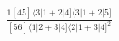 \documentclass[varwidth, border=5pt]{standalone}
\begin{document}
\begin{my}
$\begin{gathered}
\scriptscriptstyle\frac{1[45]⟨3|1+2|4]⟨3|1+2|5]}{[56]⟨1|2+3|4]⟨2|1+3|4]^2}
\end{gathered}$
\end{my}
\end{document}
